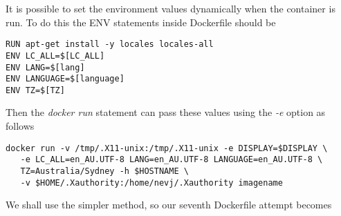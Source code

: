 \documentclass[a4paper]{article}  %
\begin{document}
It is possible to set the environment values dynamically when the container is run. To do this the ENV statements inside Dockerfile should be
\begin{tcolorbox}
\begin{verbatim}
RUN apt-get install -y locales locales-all
ENV LC_ALL=$[LC_ALL]
ENV LANG=$[lang]
ENV LANGUAGE=$[language]
ENV TZ=$[TZ]
\end{verbatim}
\end{tcolorbox}
Then the {\em docker run} statement can pass these values using the {\em -e} option as follows
\begin{tcolorbox}
\begin{verbatim}
docker run -v /tmp/.X11-unix:/tmp/.X11-unix -e DISPLAY=$DISPLAY \
   -e LC_ALL=en_AU.UTF-8 LANG=en_AU.UTF-8 LANGUAGE=en_AU.UTF-8 \
   TZ=Australia/Sydney -h $HOSTNAME \
   -v $HOME/.Xauthority:/home/nevj/.Xauthority imagename
\end{verbatim}
\end{tcolorbox}
We shall use the simpler method, so our seventh Dockerfile attempt becomes
\end{document}
